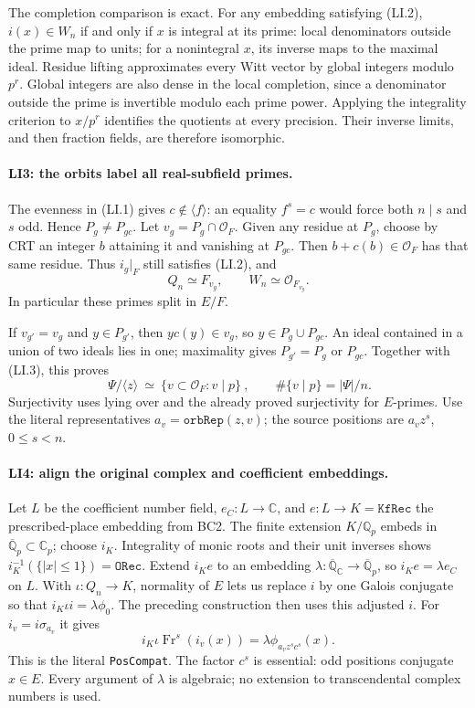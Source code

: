 \documentclass[11pt,a4paper]{article}
\numberwithin{equation}{section}
\theoremstyle{remark}\newtheorem{remark}[theorem]{Remark}
\begin{document}
The completion comparison is exact. For any embedding satisfying
(LI.2), $i(x)\in W_n$ if and only if $x$ is integral at its prime:
local denominators outside the prime map to units; for a nonintegral
$x$, its inverse maps to the maximal ideal. Residue lifting approximates
every Witt vector by global integers modulo $p^r$. Global integers are
also dense in the local completion, since a denominator outside the
prime is invertible modulo each prime power. Applying the integrality
criterion to $x/p^r$ identifies the quotients at every precision.
Their inverse limits, and then fraction fields, are therefore isomorphic.

\paragraph{LI3: the orbits label all real-subfield primes.}
The evenness in (LI.1) gives $c\notin\langle f\rangle$: an equality
$f^s=c$ would force both $n\mid s$ and $s$ odd. Hence
$P_g\ne P_{gc}$. Let $v_g=P_g\cap\mathcal O_F$.
Given any residue at $P_g$, choose by CRT an integer $b$ attaining it
and vanishing at $P_{gc}$. Then $b+c(b)\in\mathcal O_F$ has that
same residue. Thus $i_g|_F$ still satisfies (LI.2), and
\[
 Q_n\simeq F_{v_g},\qquad W_n\simeq\mathcal O_{F_{v_g}}. \tag{LI.4}
\]
In particular these primes split in $E/F$.

If $v_{g'}=v_g$ and $y\in P_{g'}$, then $yc(y)\in v_g$,
so $y\in P_g\cup P_{gc}$. An ideal contained in a union of two
ideals lies in one; maximality gives $P_{g'}=P_g$ or $P_{gc}$.
Together with (LI.3), this proves
\[
 \boxed{\ \Psi/\langle z\rangle\ \simeq\
          \{v\subset\mathcal O_F:v\mid p\}\ },
 \qquad\#\{v\mid p\}=|\Psi|/n.                         \tag{LI.5}
\]
Surjectivity uses lying over and the already proved surjectivity for
$E$-primes. Use the literal representatives $a_v=\texttt{orbRep}(z,v)$;
the source positions are $a_vz^s$, $0\le s<n$.

\paragraph{LI4: align the original complex and coefficient embeddings.}
Let $L$ be the coefficient number field, $e_C:L\to\mathbb C$, and
$e:L\to K=\texttt{KfRec}$ the prescribed-place embedding from BC2.
The finite extension $K/\mathbb Q_p$ embeds in
$\overline{\mathbb Q}_p\subset\mathbb C_p$; choose $i_K$.
Integrality of monic roots and their unit inverses shows
$i_K^{-1}(\{|x|\le1\})=\texttt{ORec}$.
Extend $i_Ke$ to an embedding
$\lambda:\overline{\mathbb Q}_{\mathbb C}\to\overline{\mathbb Q}_p$,
so $i_K e=\lambda e_C$ on $L$.
With $\iota:Q_n\to K$, normality of $E$ lets us replace $i$ by
one Galois conjugate so that $i_K\iota i=\lambda\phi_0$.
The preceding construction then uses this adjusted $i$. For
$i_v=i\sigma_{a_v}$ it gives
\[
 i_K\iota\operatorname{Fr}^{s}(i_v(x))
   =\lambda\phi_{a_vz^sc^s}(x).                         \tag{LI.6}
\]
This is the literal \texttt{PosCompat}. The factor $c^s$ is essential:
odd positions conjugate $x\in E$. Every argument of $\lambda$ is
algebraic; no extension to transcendental complex numbers is used.
\end{document}

